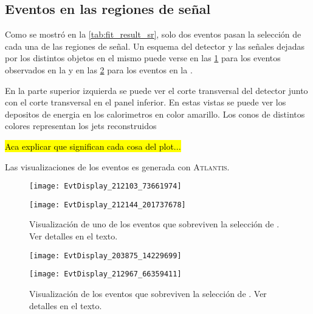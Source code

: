 \subsection{Eventos en las regiones de señal}

Como se mostró en la \cref{tab:fit_result_sr}, solo dos eventos pasan la
selección de cada una de las regiones de señal. Un esquema del detector y las
se\~nales dejadas por los distintos objetos en el mismo puede verse en las
\cref{fig:evdisplay_srl} para los eventos observados en la {\SRL} y en las
\cref{fig:evdisplay_srh} para los eventos en la {\SRH}.

En la parte superior izquierda se puede ver el corte transversal del detector
junto con el corte transversal en el panel inferior. En estas vistas se puede ver
los depositos de energia en los calorimetros en color amarillo. Los conos de distintos
colores representan los jets reconstruidos

\hl{Aca explicar que significan cada cosa del plot...}

Las visualizaciones de los eventos es generada con
\textsc{Atlantis}\cite{atlantis}.


\begin{figure}[!htbp]
  \begin{center}

    \texttt{[image: EvtDisplay\_212103\_73661974]}

    \vspace{1cm}

    \texttt{[image: EvtDisplay\_212144\_201737678]}

    \caption{Visualización de uno de los eventos que sobreviven la selección de {\SRL}. Ver detalles en el texto.} %
    \label{fig:evdisplay_srl}
  \end{center}
\end{figure}


\begin{figure}[!htbp]
  \begin{center}

    \texttt{[image: EvtDisplay\_203875\_14229699]}

    \vspace{1cm}

    \texttt{[image: EvtDisplay\_212967\_66359411]}

  \caption{Visualización de los eventos que sobreviven la selección de {\SRH}. Ver detalles en el texto.} %
  \label{fig:evdisplay_srh}
  \end{center}
\end{figure}


